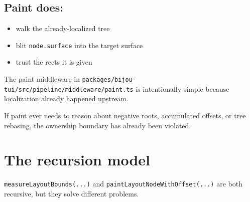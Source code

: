 \subsection{Paint does:}\label{record-049-paint-does}

\begin{itemize}
\tightlist
\item
  walk the already-localized tree
\item
  blit \texttt{n\allowbreak{}o\allowbreak{}d\allowbreak{}e\allowbreak{}.\allowbreak{}s\allowbreak{}u\allowbreak{}r\allowbreak{}f\allowbreak{}a\allowbreak{}c\allowbreak{}e} into the target surface
\item
  trust the rects it is given
\end{itemize}

The paint middleware in \texttt{p\allowbreak{}a\allowbreak{}c\allowbreak{}k\allowbreak{}a\allowbreak{}g\allowbreak{}e\allowbreak{}s\allowbreak{}/\allowbreak{}b\allowbreak{}i\allowbreak{}j\allowbreak{}o\allowbreak{}u\allowbreak{}-\allowbreak{}t\allowbreak{}u\allowbreak{}i\allowbreak{}/\allowbreak{}s\allowbreak{}r\allowbreak{}c\allowbreak{}/\allowbreak{}p\allowbreak{}i\allowbreak{}p\allowbreak{}e\allowbreak{}l\allowbreak{}i\allowbreak{}n\allowbreak{}e\allowbreak{}/\allowbreak{}m\allowbreak{}i\allowbreak{}d\allowbreak{}d\allowbreak{}l\allowbreak{}e\allowbreak{}w\allowbreak{}a\allowbreak{}r\allowbreak{}e\allowbreak{}/\allowbreak{}p\allowbreak{}a\allowbreak{}i\allowbreak{}n\allowbreak{}t\allowbreak{}.\allowbreak{}t\allowbreak{}s} is intentionally simple because localization already happened upstream.

If paint ever needs to reason about negative roots, accumulated offsets, or tree rebasing, the ownership boundary has already been violated.

\section{The recursion model}\label{record-049-the-recursion-model}

\texttt{m\allowbreak{}e\allowbreak{}a\allowbreak{}s\allowbreak{}u\allowbreak{}r\allowbreak{}e\allowbreak{}L\allowbreak{}a\allowbreak{}y\allowbreak{}o\allowbreak{}u\allowbreak{}t\allowbreak{}B\allowbreak{}o\allowbreak{}u\allowbreak{}n\allowbreak{}d\allowbreak{}s\allowbreak{}(\allowbreak{}.\allowbreak{}.\allowbreak{}.\allowbreak{})} and \texttt{p\allowbreak{}a\allowbreak{}i\allowbreak{}n\allowbreak{}t\allowbreak{}L\allowbreak{}a\allowbreak{}y\allowbreak{}o\allowbreak{}u\allowbreak{}t\allowbreak{}N\allowbreak{}o\allowbreak{}d\allowbreak{}e\allowbreak{}W\allowbreak{}i\allowbreak{}t\allowbreak{}h\allowbreak{}O\allowbreak{}f\allowbreak{}f\allowbreak{}s\allowbreak{}e\allowbreak{}t\allowbreak{}(\allowbreak{}.\allowbreak{}.\allowbreak{}.\allowbreak{})} are both recursive, but they solve different problems.


